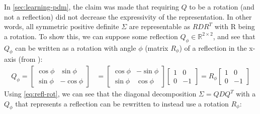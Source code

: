 \documentclass[a4paper, 12pt]{report}
\begin{document}
In \ref{sec:learning-pdm}, the claim was made that requiring $Q$ to be a rotation (and not a reflection) did not decrease the expressivity of the representation. In other words, all symmetric positive definite $\Sigma$ are representable as $RDR^T$ with R being a rotation. To show this, we can suppose some reflection $Q_\phi\in \mathbb{R}^{2\times 2}$, and see that $Q_\phi$ can be written as a rotation with angle $\phi$ (matrix $R_\phi$) of a reflection in the x-axis (from \cite{poole2015linear}):
\begin{align}
	Q_\phi=\begin{bmatrix}
		\cos \phi  &  \sin \phi  \\
		\sin \phi  &  -\cos \phi
	\end{bmatrix} &= \begin{bmatrix}
		\cos \phi  &  -\sin \phi  \\
		\sin \phi  &  \cos \phi
	\end{bmatrix} \begin{bmatrix}
		1  &  0  \\
		0  &  -1
	\end{bmatrix} = R_\phi \begin{bmatrix}
		1  &  0  \\
		0  &  -1
	\end{bmatrix} \label{eq:refl-rot}
\end{align}
Using \ref{eq:refl-rot}, we can see that the diagonal decomposition $\Sigma = QDQ^T$ with a $Q_\phi$ that represents a reflection can be rewritten to instead use a rotation $R_\phi$:
\end{document}
